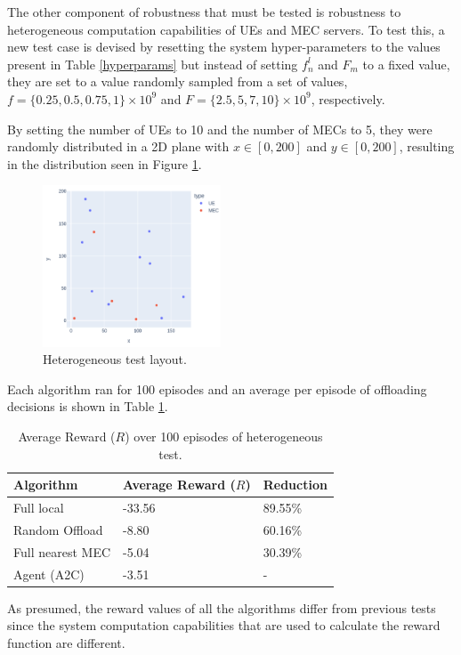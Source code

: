 The other component of robustness that must be tested is robustness to heterogeneous computation capabilities of \acrshort{UE}s and \acrshort{MEC} servers. To test this, a new test case is devised by resetting the system hyper-parameters to the values present in Table \ref{hyperparams} but instead of setting $f^l_n$ and $F_m$ to a fixed value, they are set to a value randomly sampled from a set of values, $f = \{0.25, 0.5, 0.75, 1\} \times 10^9$ and $F = \{2.5, 5, 7, 10\} \times 10^9$, respectively.

By setting the number of \acrshort{UE}s to 10 and the number of \acrshort{MEC}s to 5, they were randomly distributed in a 2D plane with $x \in [0, 200]$ and $y \in [0, 200]$, resulting in the distribution seen in Figure \ref{hetero_test}.

\begin{figure}[H]
  \centering
  \includegraphics[width=200px]{images/5_10_layout.png}
  \caption{Heterogeneous test layout.}  \label{hetero_test}
\end{figure}

Each algorithm ran for 100 episodes and an average per episode of offloading decisions is shown in Table \ref{hetero_table}.

\begin{table}[H]
\centering
\begin{tabular}{|l|l|l|}
\hline
Algorithm        & Average Reward ($R$) & Reduction\\ \hline
Full local       & -33.56 & 89.55\%\\
Random Offload   & -8.80 & 60.16\%\\
Full nearest MEC & -5.04 & 30.39\%\\ 
Agent (A2C) & -3.51 & -\\ \hline
\end{tabular}
\caption{Average Reward ($R$) over 100 episodes of heterogeneous test.} \label{hetero_table}
\end{table}

As presumed, the reward values of all the algorithms differ from previous tests since the system computation capabilities that are used to calculate the reward function are different.

